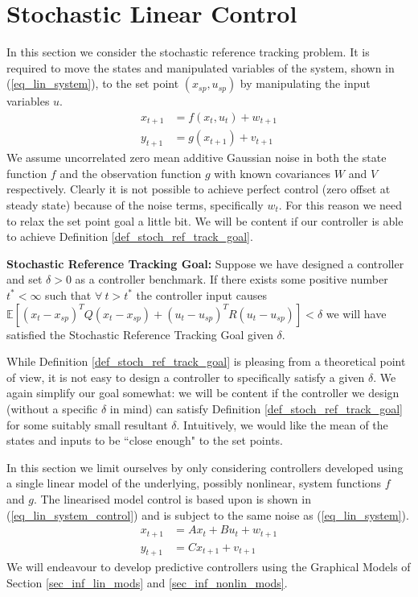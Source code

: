 \section{Stochastic Linear Control}
In this section we consider the stochastic reference tracking problem. It is required to move the states and manipulated variables of the system, shown in (\ref{eq_lin_system}), to the set point $(x_{sp}, u_{sp})$ by manipulating the input variables $u$.
\begin{equation}
\begin{aligned}
x_{t+1} &= f(x_t, u_t) + w_{t+1}  \\
y_{t+1} &= g(x_{t+1}) + v_{t+1}  
\end{aligned}
\label{eq_lin_system}
\end{equation}
We assume uncorrelated zero mean additive Gaussian noise in both the state function $f$ and the observation function $g$ with known covariances $W$ and $V$ respectively. Clearly it is not possible to achieve perfect control (zero offset at steady state) because of the noise terms, specifically $w_t$. For this reason we need to relax the set point goal a little bit. We will be content if our controller is able to achieve Definition \ref{def_stoch_ref_track_goal}.
\begin{defn}
\textbf{Stochastic Reference Tracking Goal:} Suppose we have designed a controller and set $\delta > 0$ as a controller benchmark. If there exists some positive number $t^* < \infty$ such that $\forall~t > t^*$ the controller input causes $\mathbb{E}[(x_t-x_{sp})^TQ(x_t-x_{sp}) + (u_t-u_{sp})^TR(u_t-u_{sp})] < \delta$ we will have satisfied the Stochastic Reference Tracking Goal given $\delta$.
\label{def_stoch_ref_track_goal}
\end{defn}
While Definition \ref{def_stoch_ref_track_goal} is pleasing from a theoretical point of view, it is not easy to design a controller to specifically satisfy a given $\delta$. We again simplify our goal somewhat: we will be content if the controller we design (without a specific $\delta$ in mind) can satisfy Definition \ref{def_stoch_ref_track_goal} for some suitably small resultant  $\delta$. Intuitively, we would like the mean of the states and inputs to be ``close enough" to the set points. 

In this section we limit ourselves by only considering controllers developed using a single linear model of the underlying, possibly nonlinear, system functions $f$ and $g$. The linearised model control is based upon is shown in (\ref{eq_lin_system_control}) and is subject to the same noise as (\ref{eq_lin_system}).
\begin{equation}
\begin{aligned}
x_{t+1} &= Ax_t + Bu_t + w_{t+1}  \\
y_{t+1} &= Cx_{t+1} + v_{t+1}  
\end{aligned}
\label{eq_lin_system_control}
\end{equation}
We will endeavour to develop predictive controllers using the Graphical Models of Section \ref{sec_inf_lin_mods} and \ref{sec_inf_nonlin_mods}.

